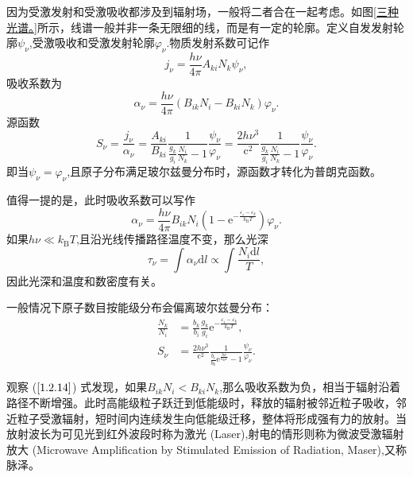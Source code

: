 \documentclass[../天体物理基础.tex]{subfiles}
\begin{document}
因为受激发射和受激吸收都涉及到辐射场，一般将二者合在一起考虑。如图\ref{三种光谱。}所示，线谱一般并非一条无限细的线，而是有一定的轮廓。定义自发发射轮廓$\psi_\nu$,受激吸收和受激发射轮廓$\varphi_\nu$.物质发射系数可记作
\begin{equation}
j_\nu=\frac{h\nu}{4\pi}A_{ki}N_k\psi_\nu,
\end{equation}
吸收系数为
\begin{equation}
\alpha_{\nu}=\frac{h\nu}{4\pi}(B_{ik}N_i-B_{ki}N_{k})\varphi_\nu.\label{1.2.14}
\end{equation}
源函数
\begin{equation}
S_\nu=\frac{j_\nu}{\alpha_\nu}=\frac{A_{ki}}{B_{ki}}\frac{1}{\frac{g_k}{g_i}\frac{N_i}{N_k}-1}\frac{\psi_\nu}{\varphi
_\nu}=\frac{2h\nu^3}{\mathrm{c}^{2}}\frac{1}{\frac{g_k}{g_i}\frac{N_i}{N_k}-1}\frac{\psi_\nu}{\varphi
_\nu}.
\end{equation}
即当$\psi_\nu=\varphi_\nu$,且原子分布满足玻尔兹曼分布时，源函数才转化为普朗克函数。

值得一提的是，此时吸收系数可以写作
\begin{equation}
\alpha_{\nu}=\frac{h\nu}{4\pi}B_{ik}N_{i}\left(1-\mathrm{e}^{-\frac{\varepsilon_{i}-\varepsilon_{k}}{k_{\text{B}}T}}\right)\varphi_{\nu}.
\end{equation}
如果$h\nu\ll k_{\text{B}}T$,且沿光线传播路径温度不变，那么光深
\begin{equation}
\tau_{\nu}=\int\alpha_{\nu}\mathrm{d}l\propto{}\int\frac{N_{i}\mathrm{d}l}{T},
\end{equation}
因此光深和温度和数密度有关。

一般情况下原子数目按能级分布会偏离玻尔兹曼分布：
\begin{align}
\frac{N_k}{N_i}&=\frac{b_k}{b_i}\frac{g_k}{g_i}\mathrm{e}^{-\frac{\varepsilon_i-\varepsilon_k}{k_{\text{B}}T}},\\
S_\nu&=\frac{2h\nu^3}{\mathrm{c}^{2}}\frac{1}{\frac{b_i}{b_k}\mathrm{e}^{\frac{h\nu}{k_{\text{B}}T}}-1}\frac{\psi_\nu}{\varphi_\nu}.
\end{align}

观察 ($\ref{1.2.14}$) 式发现，如果$B_{ik}N_{i}<B_{ki}N_{k}$,那么吸收系数为负，相当于辐射沿着路径不断增强。此时高能级粒子跃迁到低能级时，释放的辐射被邻近粒子吸收，邻近粒子受激辐射，短时间内连续发生向低能级迁移，整体将形成强有力的放射。当放射波长为可见光到红外波段时称为激光 (Laser),射电的情形则称为微波受激辐射放大 (Microwave Amplification by Stimulated Emission of Radiation, Maser),又称脉泽。
\end{document}
